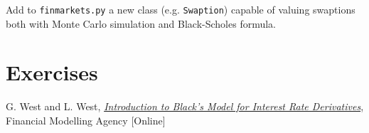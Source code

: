 %

\begin{finmarkets}
Add to \texttt{finmarkets.py} a new class (e.g. \texttt{Swaption}) capable of valuing swaptions both with Monte Carlo simulation and Black-Scholes formula.
\end{finmarkets}

\section*{Exercises}


\begin{thebibliography}{9}
 G. West and L. West, \href{http://janroman.dhis.org/finance/Black/IntroToBlack.pdf}{\emph{Introduction to Black's Model for Interest Rate Derivatives}}, Financial Modelling Agency [Online]
\end{thebibliography}